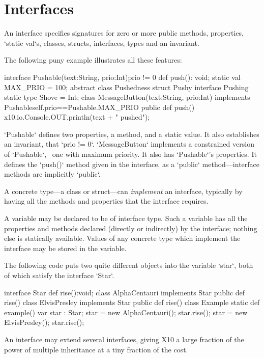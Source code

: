 \chapter{Interfaces}
\label{XtenInterfaces}

An interface specifies signatures for zero or more public methods, properties,
\xcd`static val`s, 
classes, structs, interfaces, types
and an invariant. 

The following puny example illustrates all these features: 
\begin{xten}
interface Pushable(text:String, prio:Int){prio != 0} {
  def push(): void;
  static val MAX_PRIO = 100;
  abstract class Pushedness{}
  struct Pushy{}
  interface Pushing{}
  static type Shove = Int;
}
class MessageButton(text:String, prio:Int)
  implements Pushable{self.prio==Pushable.MAX_PRIO} {
  public def push() { 
    x10.io.Console.OUT.println(text + " pushed");
  }
}
\end{xten}
%
\noindent
\xcd`Pushable` defines two properties, a method, and a static value.  It also
establishes an invariant, that \xcd`prio != 0`. 
\xcd`MessageButton` implements a constrained version of \xcd`Pushable`,
\viz\ one with maximum priority.  It also has \xcd`Pushable`'s properties.  It
defines the \xcd`push()` method given in the interface, as a \xcd`public`
method---interface methods are implicitly \xcd`public`.

A concrete type---a class or struct---can {\em implement} an interface,
typically by having all the methods and properties that the interface
requires.

A variable may be declared to be of interface type.  Such a variable has all
the properties and methods declared (directly or indirectly) by the interface;
nothing else is statically available.  Values of any concrete type which
implement the interface may be stored in the variable.  

\begin{ex}
The following code puts two quite different objects into the variable
\xcd`star`, both of which satisfy the interface \xcd`Star`.
\begin{xten}
interface Star { def rise():void; }
class AlphaCentauri implements Star {
   public def rise() {}
}
class ElvisPresley implements Star {
   public def rise() {}
}
class Example {
   static def example() {
      var star : Star;
      star = new AlphaCentauri();
      star.rise();
      star = new ElvisPresley();
      star.rise();
   }
}
\end{xten}
%
\end{ex}
An interface may extend several interfaces, giving
X10 a large fraction of the power of multiple inheritance at a tiny fraction
of the cost.

